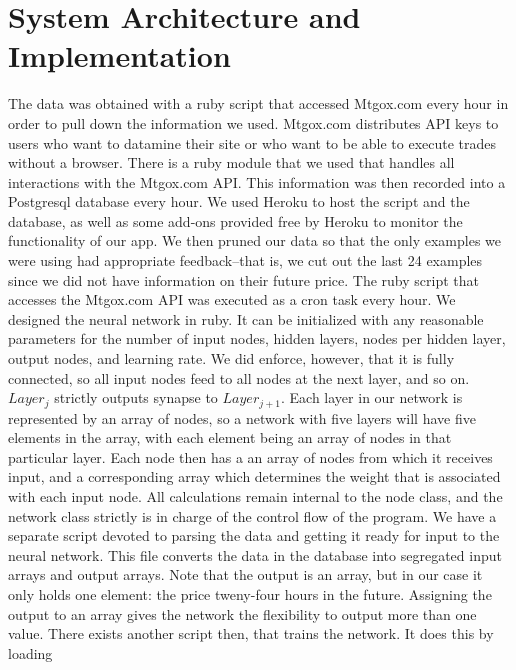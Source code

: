 \documentclass[a4paper,10pt]{article}
\begin{document}
\section{System Architecture and Implementation}
The data was obtained with a ruby script that accessed Mtgox.com every hour in order to pull down the information we used.
Mtgox.com distributes API keys to users who want to datamine their site or who want to be able to execute trades without
a browser.  There is a ruby module that we used that handles all interactions with the Mtgox.com API.
This information was then recorded into a Postgresql database every hour.  We used Heroku to host the script and the database, as 
well as some add-ons provided free by Heroku to monitor the functionality of our app.  
We then pruned our data so that the only examples we were using had appropriate feedback--that is, we cut out the last 24 examples
since we did not have information on their future price.  The ruby script that accesses the Mtgox.com API was executed as a cron
task every hour.  
\newline \newline We designed the neural network in ruby.  It can be initialized with any reasonable parameters
for the number of input nodes, hidden layers, nodes per hidden layer, output nodes, and learning rate.  We did enforce, however,
that it is fully connected, so all input nodes feed to all nodes at the next layer, and so on.  $Layer_{j}$ strictly outputs
synapse to $Layer_{j + 1}$.  Each layer in our network is represented by an array of nodes, so a network with five layers
will have five elements in the array, with each element being an array of nodes in that particular layer.  Each node then
has a an array of nodes from which it receives input, and a corresponding array which determines the weight that is associated
with each input node.  All calculations remain internal to the node class, and the network class strictly is in charge
of the control flow of the program.
\newline \newline
We have a separate script devoted to parsing the data and getting it ready for input to the neural network.  This file converts
the data in the database into segregated input arrays and output arrays.  Note that the output is an array, but in our case it
only holds one element: the price tweny-four hours in the future.  Assigning the output to an array gives the network the
flexibility to output more than one value.  There exists another script then, that trains the network.  It does this by loading
\end{document}
